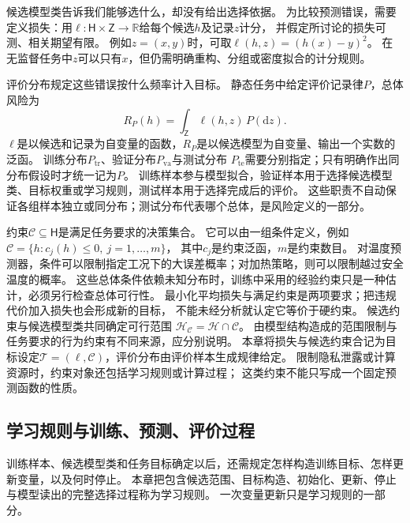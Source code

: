 候选模型类告诉我们能够选什么，却没有给出选择依据。
为比较预测错误，需要定义损失：用$\ell:\mathsf H\times\mathsf Z\to\mathbb R$给每个候选$h$及记录$z$计分，
并假定所讨论的损失可测、相关期望有限。
例如$z=(x,y)$时，可取$\ell(h,z)=(h(x)-y)^2$。
在无监督任务中$z$可以只有$x$，但仍需明确重构、分组或密度拟合的计分规则。

评价分布规定这些错误按什么频率计入目标。
静态任务中给定评价记录律$P$，总体风险为
\begin{equation}
  R_P(h)=\int_{\mathsf Z}\ell(h,z)\,P(\mathrm dz).
  \label{eq:future-unified-population-risk}
\end{equation}
$\ell$是以候选和记录为自变量的函数，$R_P$是以候选模型为自变量、输出一个实数的泛函。
训练分布$P_{\mathrm{tr}}$、验证分布$P_{\mathrm{va}}$与测试分布
$P_{\mathrm{te}}$需要分别指定；只有明确作出同分布假设时才统一记为$P$。
训练样本参与模型拟合，验证样本用于选择候选模型类、目标权重或学习规则，测试样本用于选择完成后的评价。
这些职责不自动保证各组样本独立或同分布；测试分布代表哪个总体，是风险定义的一部分。

约束$\mathcal C\subseteq\mathsf H$是满足任务要求的决策集合。
它可以由一组条件定义，例如$\mathcal C=\{h:c_j(h)\leq0,\ j=1,\ldots,m\}$，
其中$c_j$是约束泛函，$m$是约束数目。
对温度预测器，条件可以限制指定工况下的大误差概率；对加热策略，则可以限制越过安全温度的概率。
这些总体条件依赖未知分布时，训练中采用的经验约束只是一种估计，必须另行检查总体可行性。
最小化平均损失与满足约束是两项要求；把违规代价加入损失也会形成新的目标，
不能未经分析就认定它等价于硬约束。
候选约束与候选模型类共同确定可行范围
$\mathcal H_{\mathcal C}=\mathcal H\cap\mathcal C$。
由模型结构造成的范围限制与任务要求的行为约束有不同来源，应分别说明。
本章将损失与候选约束合记为目标设定$\mathcal T=(\ell,\mathcal C)$，评价分布由评价样本生成规律给定。
限制隐私泄露或计算资源时，约束对象还包括学习规则或计算过程；
这类约束不能只写成一个固定预测函数的性质。

\subsection{学习规则与训练、预测、评价过程}
\label{sec:future-learning-common-objects}
\label{sec:future-sampling-and-empirical-objective}
\label{sec:future-population-empirical-computation}

训练样本、候选模型类和任务目标确定以后，还需规定怎样构造训练目标、怎样更新变量，以及何时停止。
本章把包含候选范围、目标构造、初始化、更新、停止与模型读出的完整选择过程称为学习规则。
一次变量更新只是学习规则的一部分。

